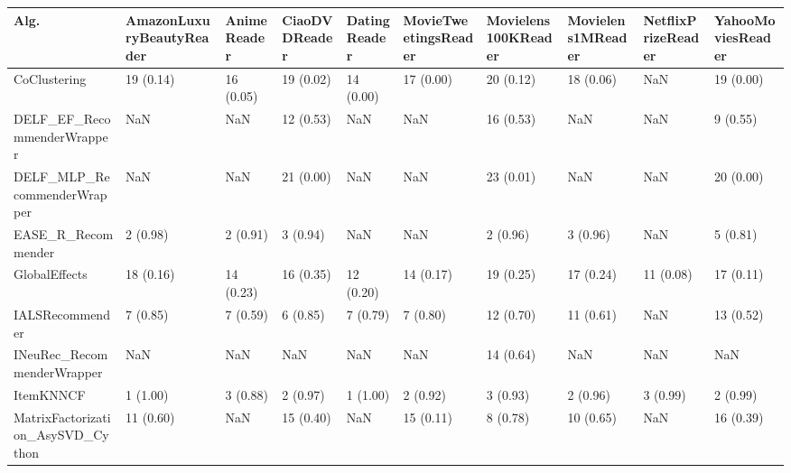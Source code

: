 \begin{tabular}{llllllllll}
\toprule
                               Alg. & AmazonLuxuryBeautyReader & AnimeReader & CiaoDVDReader & DatingReader & MovieTweetingsReader & Movielens100KReader & Movielens1MReader & NetflixPrizeReader & YahooMoviesReader \\
\midrule
                       CoClustering &                19 (0.14) &   16 (0.05) &     19 (0.02) &    14 (0.00) &            17 (0.00) &           20 (0.12) &         18 (0.06) &                NaN &         19 (0.00) \\
         DELF\_EF\_RecommenderWrapper &                      NaN &         NaN &     12 (0.53) &          NaN &                  NaN &           16 (0.53) &               NaN &                NaN &          9 (0.55) \\
        DELF\_MLP\_RecommenderWrapper &                      NaN &         NaN &     21 (0.00) &          NaN &                  NaN &           23 (0.01) &               NaN &                NaN &         20 (0.00) \\
                 EASE\_R\_Recommender &                 2 (0.98) &    2 (0.91) &      3 (0.94) &          NaN &                  NaN &            2 (0.96) &          3 (0.96) &                NaN &          5 (0.81) \\
                      GlobalEffects &                18 (0.16) &   14 (0.23) &     16 (0.35) &    12 (0.20) &            14 (0.17) &           19 (0.25) &         17 (0.24) &          11 (0.08) &         17 (0.11) \\
                    IALSRecommender &                 7 (0.85) &    7 (0.59) &      6 (0.85) &     7 (0.79) &             7 (0.80) &           12 (0.70) &         11 (0.61) &                NaN &         13 (0.52) \\
         INeuRec\_RecommenderWrapper &                      NaN &         NaN &           NaN &          NaN &                  NaN &           14 (0.64) &               NaN &                NaN &               NaN \\
                          ItemKNNCF &                 1 (1.00) &    3 (0.88) &      2 (0.97) &     1 (1.00) &             2 (0.92) &            3 (0.93) &          2 (0.96) &           3 (0.99) &          2 (0.99) \\
  MatrixFactorization\_AsySVD\_Cython &                11 (0.60) &         NaN &     15 (0.40) &          NaN &            15 (0.11) &            8 (0.78) &         10 (0.65) &                NaN &         16 (0.39) \\

\end{tabular}
